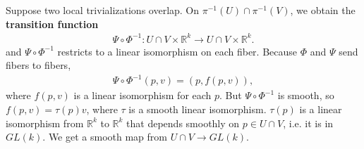 \documentclass{../mathnotes}
\begin{document}
\begin{defn}
    Suppose two local trivializations overlap. On $\pi^{-1}(U)\cap \pi^{-1}(V)$, we obtain the \textbf{transition function}
    \begin{align*}
        \Psi\circ\Phi^{-1}:U\cap V\times \mathbb{R}^k\to U\cap V\times \mathbb{R}^k.
    \end{align*}
    and $\Psi\circ\Phi^{-1}$ restricts to a linear isomorphism on each fiber. Because $\Phi$ and $\Psi$ send fibers to fibers,
    \begin{align*}
        \Psi\circ\Phi^{-1}(p,v)=(p, f(p, v)),
    \end{align*}
    where $f(p,v)$ is a linear isomorphism for each $p$. But $\Psi\circ\Phi^{-1}$ is smooth, so $f(p,v)=\tau(p)v$, where $\tau$ is a smooth
    linear isomorphism. $\tau(p)$ is a linear isomorphism from $\mathbb{R}^k$ to $\mathbb{R}^k$ that depends smoothly on $p\in U\cap V$,
    i.e. it is in $GL(k)$. We get a smooth map from $U\cap V\to GL(k)$.
\end{defn}
\end{document}
